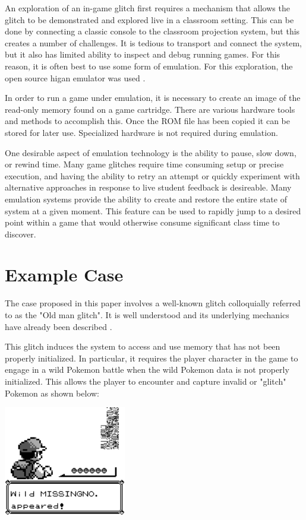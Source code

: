 \documentclass[letterpaper]{article}
\begin{document}
An exploration of an in-game glitch first requires a mechanism that allows the glitch to be demonstrated and explored live in a classroom setting. This can be done by connecting a classic console to the classroom projection system, but this creates a number of challenges. It is tedious to transport and connect the system, but it also has limited ability to inspect and debug running games. For this reason, it is often best to use some form of emulation. For this exploration, the open source higan emulator was used \cite{ginder2004higan}.

In order to run a game under emulation, it is necessary to create an image of the read-only memory found on a game cartridge. There are various hardware tools and methods to accomplish this. Once the ROM file has been copied it can be stored for later use. Specialized hardware is not required during emulation.

One desirable aspect of emulation technology is the ability to pause, slow down, or rewind time. Many game glitches require time consuming setup or precise execution, and having the ability to retry an attempt or quickly experiment with alternative approaches in response to live student feedback is desireable. Many emulation systems provide the ability to create and restore the entire state of system at a given moment. This feature can be used to rapidly jump to a desired point within a game that would otherwise consume significant class time to discover.

\section{Example Case}
The case proposed in this paper involves a well-known glitch colloquially referred to as the "Old man glitch". It is well understood and its underlying mechanics have already been described \cite{bulbapedia2005} \cite{scrumpy2016missing}.

This glitch induces the system to access and use memory that has not been properly initialized. In particular, it requires the player character in the game to engage in a wild Pokemon battle when the wild Pokemon data is not properly initialized. This allows the player to encounter and capture invalid or "glitch" Pokemon as shown below:

\noindent %
\begin{minipage}{\textwidth}
    \centering
    \includegraphics[width=0.4\textwidth]{missingno.png}
    \label{fig:missingno}
\end{minipage}
\end{document}

